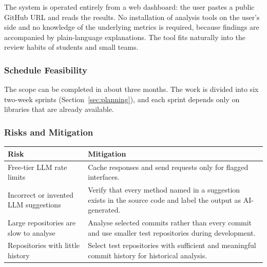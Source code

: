 \documentclass[12pt,a4paper]{article}
\begin{document}
\begin{spacing}{1.5}
\justifying
The system is operated entirely from a web dashboard: the user pastes
a public GitHub URL and reads the results. No installation of analysis
tools on the user's side and no knowledge of the underlying metrics is
required, because findings are accompanied by plain-language explanations.
The tool fits naturally into the review habits of students and small teams.
\end{spacing}

\subsubsection{Schedule Feasibility}

\begin{spacing}{1.5}
\justifying
The scope can be completed in about three months. The work is divided
into six two-week sprints (Section~\ref{sec:planning}), and each sprint
depends only on libraries that are already available.
\end{spacing}


\subsubsection{Risks and Mitigation}

\begin{table}[htbp]
\centering
\label{tab:risks}
\renewcommand{\arraystretch}{1.5}
\setlength{\tabcolsep}{8pt}

\begin{tabular}{|L{2.0in}|L{3.35in}|}
\hline
\textbf{Risk} & \textbf{Mitigation} \\
\hline
Free-tier LLM rate limits
& Cache responses and send requests only for flagged interfaces. \\
\hline
Incorrect or invented LLM suggestions
& Verify that every method named in a suggestion exists in the source code and label the output as AI-generated. \\
\hline
Large repositories are slow to analyse
& Analyse selected commits rather than every commit and use smaller test repositories during development. \\
\hline
Repositories with little history
& Select test repositories with sufficient and meaningful commit history for historical analysis. \\
\hline
\end{tabular}
\end{table}
\end{document}

